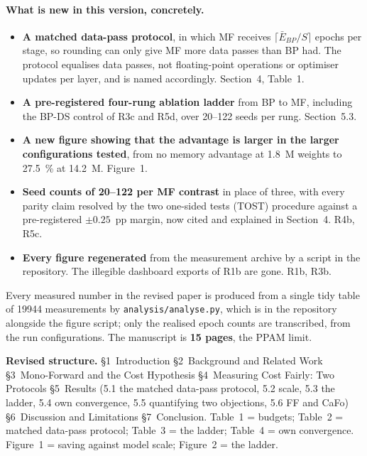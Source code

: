 \documentclass[11pt,a4paper]{article}
\newcommand{\FF}{FF}
\newcommand{\MF}{MF}
\newcommand{\BP}{BP}
\newcommand{\CaFo}{CaFo}
\newcommand{\BPDS}{BP-DS}
\begin{document}
\paragraph{What is new in this version, concretely.}
\begin{itemize}[topsep=4pt,itemsep=0pt,parsep=0pt,leftmargin=1.4em]
  \item \textbf{A matched data-pass protocol}, in which \MF{} receives
        $\lceil \bar{E}_{\BP{}}/S \rceil$ epochs per stage, so rounding can
        only give \MF{} more data passes than \BP{} had. The protocol
        equalises data passes, not floating-point operations or optimiser
        updates per layer, and is named accordingly. Section~4, Table~1.
  \item \textbf{A pre-registered four-rung ablation ladder} from \BP{} to
        \MF{}, including the \BPDS{} control of R3c and R5d, over
        \numrange{20}{122} seeds per rung. Section~5.3.
  \item \textbf{A new figure showing that the advantage is larger in the
        larger configurations tested}, from no memory advantage at \num{1.8}~M weights to
        \SI{27.5}{\percent} at \num{14.2}~M. Figure~1.
  \item \textbf{Seed counts of \numrange{20}{122} per \MF{} contrast} in place of
        three, with every parity claim resolved by the two one-sided tests
        (TOST) procedure against a pre-registered $\pm\num{0.25}$~pp margin,
        now cited and explained in Section~4. R4b, R5c.
  \item \textbf{Every figure regenerated} from the measurement archive by a
        script in the repository. The illegible dashboard exports of R1b are
        gone. R1b, R3b.
\end{itemize}

\noindent
Every measured number in the revised paper is produced from a single tidy table
of \num{19944} measurements by \texttt{analysis/analyse.py}, which is in the
repository alongside the figure script; only the realised epoch counts are
transcribed, from the run configurations. The manuscript is \textbf{15 pages},
the PPAM limit.

\bigskip
\noindent\textbf{Revised structure.}
\S1~Introduction \textbar{} \S2~Background and Related Work \textbar{}
\S3~Mono-Forward and the Cost Hypothesis \textbar{}
\S4~Measuring Cost Fairly: Two Protocols \textbar{}
\S5~Results (5.1 the matched data-pass protocol, 5.2 scale, 5.3 the ladder,
5.4 own convergence, 5.5 quantifying two objections, 5.6 \FF{} and \CaFo{})
\textbar{} \S6~Discussion and Limitations \textbar{} \S7~Conclusion.
Table~1 = budgets; Table~2 = matched data-pass protocol; Table~3 = the ladder;
Table~4 = own convergence. Figure~1 = saving against model scale;
Figure~2 = the ladder.
\end{document}
